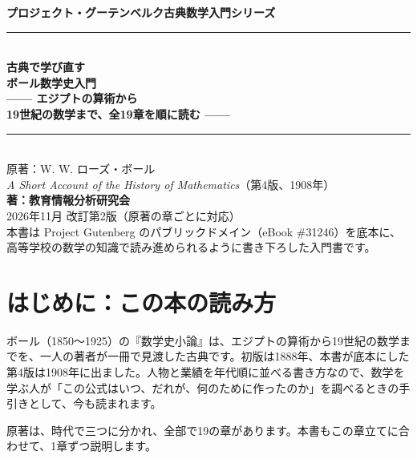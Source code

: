 \documentclass[a4paper,11pt,openany]{ltjsbook}
\begin{document}
\begin{titlepage}
\begin{center}
\vspace*{1.5cm}
{\Large\bfseries プロジェクト・グーテンベルク古典数学入門シリーズ}\\[0.8cm]
\rule{\textwidth}{1.5pt}\\[0.4cm]
{\Huge\bfseries 古典で学び直す\\ボール数学史入門}\\[0.4cm]
{\Large\bfseries —— エジプトの算術から\\19世紀の数学まで、全19章を順に読む ——}\\[0.4cm]
\rule{\textwidth}{1.5pt}\\[1.5cm]
{\large 原著：W. W. ローズ・ボール\\
\textit{A Short Account of the History of Mathematics}（第4版、1908年）}\\[2.0cm]
{\Large\bfseries 著：教育情報分析研究会}\\[2.5cm]
\vfill
{\large 2026年11月 改訂第2版（原著の章ごとに対応）}\\[0.5cm]
{\footnotesize 本書は Project Gutenberg のパブリックドメイン（eBook \#31246）を底本に、\\
高等学校の数学の知識で読み進められるように書き下ろした入門書です。}
\end{center}
\end{titlepage}

\frontmatter
\tableofcontents
\mainmatter

\chapter*{はじめに：この本の読み方}

ボール（1850〜1925）の『数学史小論』は、エジプトの算術から19世紀の数学までを、一人の著者が一冊で見渡した古典です。初版は1888年、本書が底本にした第4版は1908年に出ました。人物と業績を年代順に並べる書き方なので、数学を学ぶ人が「この公式はいつ、だれが、何のために作ったのか」を調べるときの手引きとして、今も読まれます。

原著は、時代で三つに分かれ、全部で19の章があります。本書もこの章立てに合わせて、1章ずつ説明します。
\end{document}
